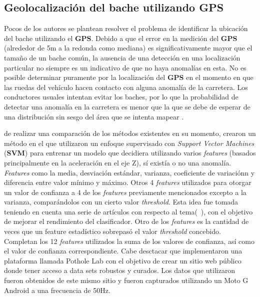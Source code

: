 	\subsection{Geolocalización del bache utilizando GPS}
		Pocos de los autores se plantean resolver el problema de identificar la ubicación del bache utilizando el \textbf{GPS}. Debido a que el
		error en la medición del \textbf{GPS} (alrededor de 5m a la redonda como mediana) es significativamente mayor que el tamaño de un bache
		común, la ausencia de una detección en una localización particular no siempre es un indicativo de que no haya anomalías en esta. No es
		posible determinar puramente por la localización del \textbf{GPS} en el momento en que las ruedas del vehículo hacen contacto con alguna
		anomalía de la carretera. Los conductores usuales intentan evitar los baches, por lo que la probabilidad de detectar una anomalía en la
		carretera es menor que la que se debe de esperar de una distribución sin sesgo del área que se intenta mapear .

		 de realizar una comparación de los métodos existentes en su momento, crearon un método en el que utilizaron
		un enfoque supervisado con \emph{Support Vector Machines} (\textbf{SVM}) para entrenar un modelo que decidiera utilizando varios \emph{features}
		(basados principalmente en la aceleración en el eje Z), sí existía o no una anomalía. \emph{Features} como la media, desviación estándar, varianza,
		coeficiente de variaciónn y diferencia entre valor mínimo y máximo. Otros 4 \emph{features} utilizados para otorgar un valor de confianza
		a 4 de los \emph{features} previamente mencionados excepto a la varianza, comparándolos con un cierto valor \emph{threshold}. Esta idea
		fue tomada teniendo en cuenta una serie de artículos con respecto al tema(~), con el objetivo de mejorar el
		rendimiento del clasificador. Otro de los \emph{features} es la cantidad de veces que un feature estadístico sobrepasó el valor \emph
		{threshold} concebido. Completan los 12 \emph{features} utilizados la suma de los valores de confianza, así como el valor de confianza
		correspondiente. Cabe desctacar que implementaron una plataforma llamada Pothole Lab con el objetivo de crear un sitio web público donde
		tener acceso a data sets robustos y curados. Los datos que utilizaron fueron obtenidos de este mismo sitio y fueron capturados utilizando
		un Moto G Android a una frecuencia de 50Hz.\\

